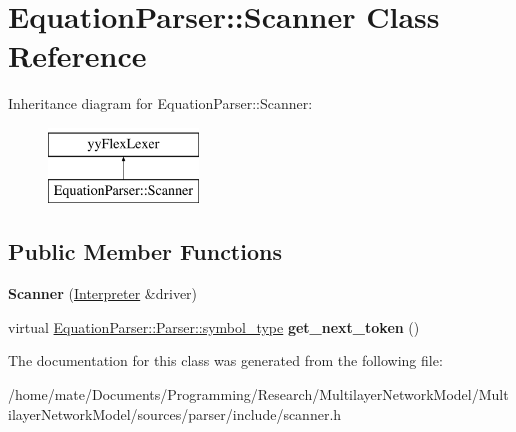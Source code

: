 \hypertarget{classEquationParser_1_1Scanner}{}\section{Equation\+Parser\+:\+:Scanner Class Reference}
\label{classEquationParser_1_1Scanner}
Inheritance diagram for Equation\+Parser\+:\+:Scanner\+:\begin{figure}[H]
\begin{center}
\leavevmode
\includegraphics[height=2.000000cm]{classEquationParser_1_1Scanner}
\end{center}
\end{figure}
\subsection*{Public Member Functions}
\begin{DoxyCompactItemize}
\item 
{\bfseries Scanner} (\hyperlink{classEquationParser_1_1Interpreter}{Interpreter} \&driver)\hypertarget{classEquationParser_1_1Scanner_a383aac4a7ce836b3c656675aaeeb32a6}{}\label{classEquationParser_1_1Scanner_a383aac4a7ce836b3c656675aaeeb32a6}

\item 
virtual \hyperlink{classEquationParser_1_1Parser_ac7f402ded60cb9ac9bb65f5d2bc9d79c}{Equation\+Parser\+::\+Parser\+::symbol\+\_\+type} {\bfseries get\+\_\+next\+\_\+token} ()\hypertarget{classEquationParser_1_1Scanner_a679ce79f0470304c865aa1060dd7d5cd}{}\label{classEquationParser_1_1Scanner_a679ce79f0470304c865aa1060dd7d5cd}

\end{DoxyCompactItemize}


The documentation for this class was generated from the following file\+:\begin{DoxyCompactItemize}
\item 
/home/mate/\+Documents/\+Programming/\+Research/\+Multilayer\+Network\+Model/\+Multilayer\+Network\+Model/sources/parser/include/scanner.\+h\end{DoxyCompactItemize}
